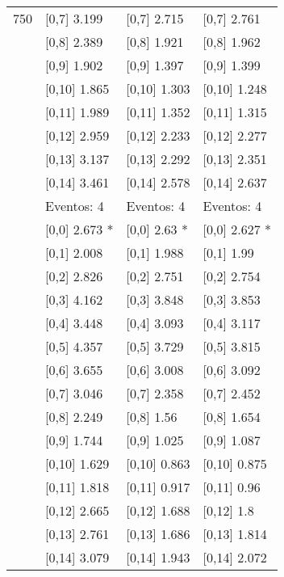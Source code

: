 \begin{table}
\begin{tabular}[t]{llll}
750 & {}[0,7] 3.199 & {}[0,7] 2.715 & {}[0,7] 2.761\\
\addlinespace
 & {}[0,8] 2.389 & {}[0,8] 1.921 & {}[0,8] 1.962\\
 & {}[0,9] 1.902 & {}[0,9] 1.397 & {}[0,9] 1.399\\
 & {}[0,10] 1.865 & {}[0,10] 1.303 & {}[0,10] 1.248\\
 & {}[0,11] 1.989 & {}[0,11] 1.352 & {}[0,11] 1.315\\
 & {}[0,12] 2.959 & {}[0,12] 2.233 & {}[0,12] 2.277\\
\addlinespace
 & {}[0,13] 3.137 & {}[0,13] 2.292 & {}[0,13] 2.351\\
 & {}[0,14] 3.461 & {}[0,14] 2.578 & {}[0,14] 2.637\\
 & Eventos:  4 & Eventos:  4 & Eventos:  4\\
 & {}[0,0] 2.673 * & {}[0,0] 2.63 * & {}[0,0] 2.627 *\\
 & {}[0,1] 2.008 & {}[0,1] 1.988 & {}[0,1] 1.99\\
\addlinespace
 & {}[0,2] 2.826 & {}[0,2] 2.751 & {}[0,2] 2.754\\
 & {}[0,3] 4.162 & {}[0,3] 3.848 & {}[0,3] 3.853\\
 & {}[0,4] 3.448 & {}[0,4] 3.093 & {}[0,4] 3.117\\
 & {}[0,5] 4.357 & {}[0,5] 3.729 & {}[0,5] 3.815\\
 & {}[0,6] 3.655 & {}[0,6] 3.008 & {}[0,6] 3.092\\
\addlinespace
1000 & {}[0,7] 3.046 & {}[0,7] 2.358 & {}[0,7] 2.452\\
 & {}[0,8] 2.249 & {}[0,8] 1.56 & {}[0,8] 1.654\\
 & {}[0,9] 1.744 & {}[0,9] 1.025 & {}[0,9] 1.087\\
 & {}[0,10] 1.629 & {}[0,10] 0.863 & {}[0,10] 0.875\\
 & {}[0,11] 1.818 & {}[0,11] 0.917 & {}[0,11] 0.96\\
\addlinespace
 & {}[0,12] 2.665 & {}[0,12] 1.688 & {}[0,12] 1.8\\
 & {}[0,13] 2.761 & {}[0,13] 1.686 & {}[0,13] 1.814\\
 & {}[0,14] 3.079 & {}[0,14] 1.943 & {}[0,14] 2.072\\
\bottomrule
\end{tabular}
\end{table}
